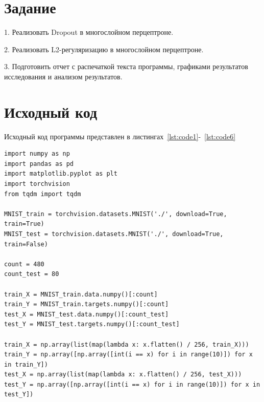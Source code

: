 \documentclass[a4paper, 14pt]{extarticle}
\begin{document}
\renewcommand{\ttdefault}{pcr}

\setlength{\tabcolsep}{3pt}
\newpage
\setcounter{page}{2}

\section{Задание}\label{Sect::task}
1. Реализовать Dropout в многослойном перцептроне.

2. Реализовать L2-регуляризацию в многослойном перцептроне.

3. Подготовить отчет с распечаткой текста программы, графиками
результатов исследования и анализом результатов.
\newpage
\section{Исходный код}

Исходный код программы представлен в листингах~\ref{lst:code1}-~\ref{lst:code6}

\begin{lstlisting}[language={},caption={Подготовка датасета},label={lst:code1}, breaklines=true]
import numpy as np
import pandas as pd
import matplotlib.pyplot as plt
import torchvision
from tqdm import tqdm

MNIST_train = torchvision.datasets.MNIST('./', download=True, train=True)
MNIST_test = torchvision.datasets.MNIST('./', download=True, train=False)

count = 480
count_test = 80

train_X = MNIST_train.data.numpy()[:count]
train_Y = MNIST_train.targets.numpy()[:count]
test_X = MNIST_test.data.numpy()[:count_test]
test_Y = MNIST_test.targets.numpy()[:count_test]

train_X = np.array(list(map(lambda x: x.flatten() / 256, train_X)))
train_Y = np.array([np.array([int(i == x) for i in range(10)]) for x in train_Y])
test_X = np.array(list(map(lambda x: x.flatten() / 256, test_X)))
test_Y = np.array([np.array([int(i == x) for i in range(10)]) for x in test_Y])
\end{lstlisting}
\end{document}
